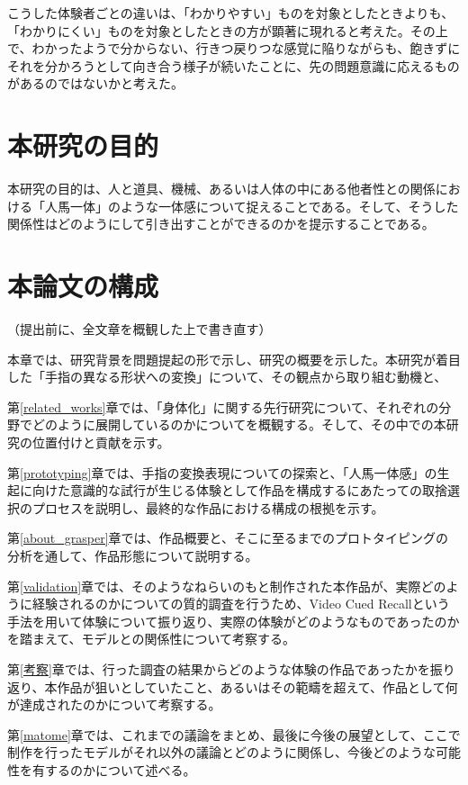 こうした体験者ごとの違いは、「わかりやすい」ものを対象としたときよりも、「わかりにくい」ものを対象としたときの方が顕著に現れると考えた。その上で、わかったようで分からない、行きつ戻りつな感覚に陥りながらも、飽きずにそれを分かろうとして向き合う様子が続いたことに、先の問題意識に応えるものがあるのではないかと考えた。

\section{本研究の目的}

本研究の目的は、人と道具、機械、あるいは人体の中にある他者性との関係における「人馬一体」のような一体感について捉えることである。そして、そうした関係性はどのようにして引き出すことができるのかを提示することである。

\section{本論文の構成}
（提出前に、全文章を概観した上で書き直す）

本章では、研究背景を問題提起の形で示し、研究の概要を示した。本研究が着目した「手指の異なる形状への変換」について、その観点から取り組む動機と、

第\ref{related_works}章では、「身体化」に関する先行研究について、それぞれの分野でどのように展開しているのかについてを概観する。そして、その中での本研究の位置付けと貢献を示す。

第\ref{prototyping}章では、手指の変換表現についての探索と、「人馬一体感」の生起に向けた意識的な試行が生じる体験として作品を構成するにあたっての取捨選択のプロセスを説明し、最終的な作品における構成の根拠を示す。

第\ref{about_grasper}章では、作品概要と、そこに至るまでのプロトタイピングの分析を通して、作品形態について説明する。

第\ref{validation}章では、そのようなねらいのもと制作された本作品が、実際どのように経験されるのかについての質的調査を行うため、Video Cued Recallという手法を用いて体験について振り返り、実際の体験がどのようなものであったのかを踏まえて、モデルとの関係性について考察する。

第\ref{考察}章では、行った調査の結果からどのような体験の作品であったかを振り返り、本作品が狙いとしていたこと、あるいはその範疇を超えて、作品として何が達成されたのかについて考察する。

第\ref{matome}章では、これまでの議論をまとめ、最後に今後の展望として、ここで制作を行ったモデルがそれ以外の議論とどのように関係し、今後どのような可能性を有するのかについて述べる。